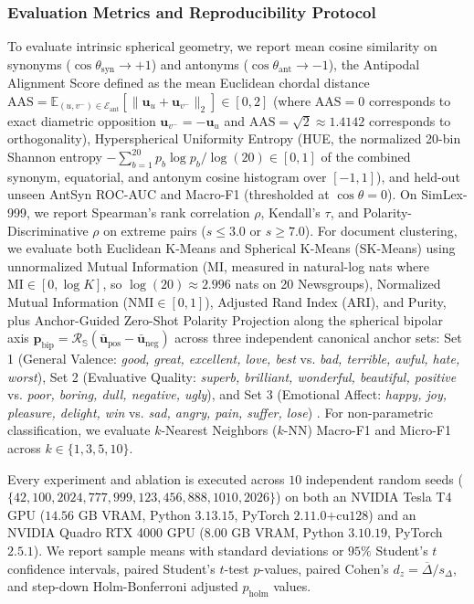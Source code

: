 \documentclass[journal]{IEEEtran}
\begin{document}
\subsubsection{Evaluation Metrics and Reproducibility Protocol}
To evaluate intrinsic spherical geometry, we report mean cosine similarity on synonyms ($\cos\theta_{\text{syn}} \to +1$) and antonyms ($\cos\theta_{\text{ant}} \to -1$), the Antipodal Alignment Score defined as the mean Euclidean chordal distance $\text{AAS} = \mathbb{E}_{(u,v^-)\in\mathcal{E}_{\text{ant}}}[\|\mathbf{u}_u + \mathbf{u}_{v^-}\|_2] \in [0, 2]$ (where $\text{AAS} = 0$ corresponds to exact diametric opposition $\mathbf{u}_{v^-} = -\mathbf{u}_u$ and $\text{AAS} = \sqrt{2} \approx 1.4142$ corresponds to orthogonality), Hyperspherical Uniformity Entropy (HUE, the normalized 20-bin Shannon entropy $-\sum_{b=1}^{20} p_b \log p_b / \log(20) \in [0, 1]$ of the combined synonym, equatorial, and antonym cosine histogram over $[-1, 1]$), and held-out unseen AntSyn ROC-AUC and Macro-F1 (thresholded at $\cos\theta = 0$). On SimLex-999, we report Spearman's rank correlation $\rho$, Kendall's $\tau$, and Polarity-Discriminative $\rho$ on extreme pairs ($s \le 3.0$ or $s \ge 7.0$). For document clustering, we evaluate both Euclidean K-Means and Spherical K-Means (SK-Means) using unnormalized Mutual Information (MI, measured in natural-log nats where $\text{MI} \in [0, \log K]$, so $\log(20) \approx 2.996$ nats on 20 Newsgroups), Normalized Mutual Information ($\text{NMI} \in [0, 1]$), Adjusted Rand Index (ARI), and Purity, plus Anchor-Guided Zero-Shot Polarity Projection along the spherical bipolar axis $\mathbf{p}_{\text{bip}} = \mathcal{R}_{\mathbb{S}}(\bar{\mathbf{u}}_{\text{pos}} - \bar{\mathbf{u}}_{\text{neg}})$ across three independent canonical anchor sets: Set 1 (General Valence: \textit{good, great, excellent, love, best} vs. \textit{bad, terrible, awful, hate, worst}), Set 2 (Evaluative Quality: \textit{superb, brilliant, wonderful, beautiful, positive} vs. \textit{poor, boring, dull, negative, ugly}), and Set 3 (Emotional Affect: \textit{happy, joy, pleasure, delight, win} vs. \textit{sad, angry, pain, suffer, lose}) \cite{turney2002thumbs,hamilton2016inducing}. For non-parametric classification, we evaluate $k$-Nearest Neighbors ($k$-NN) Macro-F1 and Micro-F1 across $k \in \{1, 3, 5, 10\}$.

Every experiment and ablation is executed across $10$ independent random seeds ($\{42, 100, 2024, 777, 999, 123, 456, 888, 1010, 2026\}$) on both an NVIDIA Tesla T4 GPU ($14.56$ GB VRAM, Python $3.13.15$, PyTorch $2.11.0\text{+cu128}$) and an NVIDIA Quadro RTX 4000 GPU ($8.00$ GB VRAM, Python $3.10.19$, PyTorch $2.5.1$). We report sample means with standard deviations or $95\%$ Student's $t$ confidence intervals, paired Student's $t$-test $p$-values, paired Cohen's $d_z = \overline{\Delta} / s_{\Delta}$, and step-down Holm-Bonferroni adjusted $p_{\text{holm}}$ values.
\end{document}
